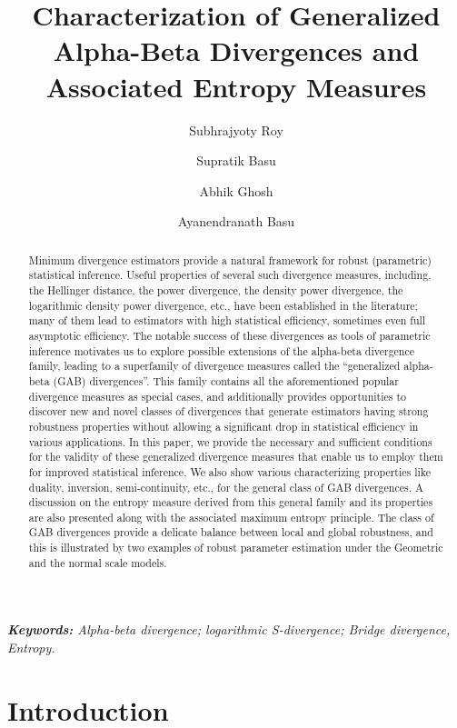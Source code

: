 \documentclass[11pt]{article}
\title{Characterization of Generalized Alpha-Beta Divergences and Associated Entropy Measures}
\date{}
\author[1]{Subhrajyoty Roy}
\affil[1]{Washington University in St. Louis, St. Louis, USA}
\author[2]{Supratik Basu}
\affil[2]{Duke University, Durham, USA}
\author[3]{Abhik Ghosh}
\author[3]{Ayanendranath Basu}
\affil[3]{Indian Statistical Institute, Kolkata, India}
\theoremstyle{plain}
\theoremstyle{remark}
\begin{document}
\maketitle

\begin{abstract}
Minimum divergence estimators provide a natural framework for robust (parametric) statistical inference. Useful properties of several such divergence measures, including, the Hellinger distance, the power divergence, the density power divergence, the logarithmic density power divergence, etc., have been established in the literature; many of them lead to estimators with high statistical efficiency, sometimes even full asymptotic efficiency. The notable success of these divergences as tools of parametric inference motivates us to explore possible extensions of the alpha-beta divergence family, leading to a superfamily of divergence measures called the ``generalized alpha-beta (GAB) divergences''. This family contains all the aforementioned popular divergence measures as special cases, and additionally provides opportunities to discover new and novel classes of divergences that generate estimators having strong robustness properties without allowing a significant drop in statistical efficiency in various applications. In this paper, we provide the necessary and sufficient conditions for the validity of these generalized divergence measures that enable us to employ them for improved statistical inference. We also show various characterizing properties like duality, inversion, semi-continuity, etc., for the general class of GAB divergences. A discussion on the entropy measure derived from this general family and its properties are also presented  along with the associated maximum entropy principle. The class of GAB divergences provide a delicate balance between local and global robustness, and this is illustrated by two examples of robust parameter estimation under the Geometric and the normal scale models.
\end{abstract}

\emph{\textbf{Keywords:} Alpha-beta divergence; logarithmic S-divergence; Bridge divergence, Entropy.}

\section{Introduction}\label{sec:intro}
\end{document}

